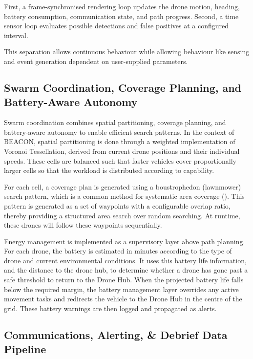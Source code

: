First, a frame-synchronised rendering loop updates the drone motion, heading, battery consumption, communication state, and path progress.
Second, a time sensor loop evaluates possible detections and false positives at a configured interval.

This separation allows continuous behaviour while allowing behaviour like sensing and event generation dependent on user-supplied parameters.

\subsection{Swarm Coordination, Coverage Planning, and Battery-Aware Autonomy}\label{subsec:swarm-coordination-coverage-planning-and-battery-aware-autonomy}

Swarm coordination combines spatial partitioning, coverage planning, and battery-aware autonomy to enable efficient search patterns.
In the context of BEACON, spatial partitioning is done through a weighted implementation of Voronoi Tessellation, derived from current drone positions and their individual speeds.
These cells are balanced such that faster vehicles cover proportionally larger cells so that the workload is distributed according to capability.

For each cell, a coverage plan is generated using a boustrophedon (lawnmower) search pattern, which is a common method for systematic area coverage (\cite{10.1007/978-1-4471-1273-0_32}).
This pattern is generated as a set of waypoints with a configurable overlap ratio, thereby providing a structured area search over random searching.
At runtime, these drones will follow these waypoints sequentially.

Energy management is implemented as a supervisory layer above path planning.
For each drone, the battery is estimated in minutes according to the type of drone and current environmental conditions.
It uses this battery life information, and the distance to the drone hub, to determine whether a drone has gone past a safe threshold to return to the Drone Hub.
When the projected battery life falls below the required margin, the battery management layer overrides any active movement tasks and redirects the vehicle to the Drone Hub in the centre of the grid.
These battery warnings are then logged and propagated as alerts.

\subsection{Communications, Alerting, \& Debrief Data Pipeline}\label{subsec:communications-alerting-debrief-data-pipeline}


